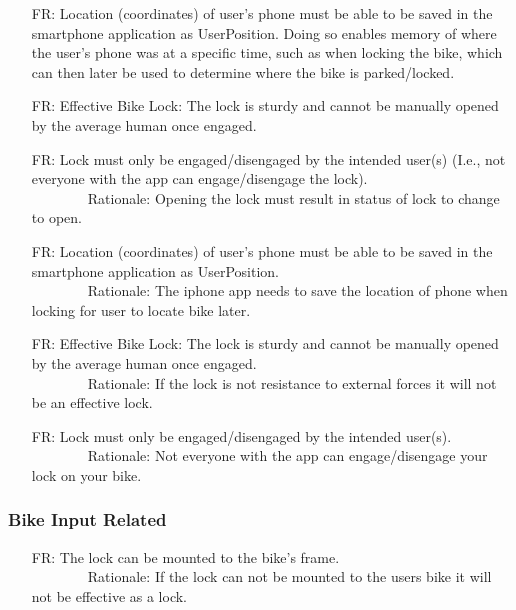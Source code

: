 \documentclass[12pt]{article}
\newcounter{reqnum} %
\newcounter{nfrnum} %
\begin{document}
\begin{itemize}
\item[FR\refstepcounter{reqnum}\thereqnum\label{FR7}:] Location (coordinates) of user’s phone must be able to be saved in the smartphone application as UserPosition. Doing so enables memory of where the user's phone was at a specific time, such as when locking the bike, which can then later be used to determine where the bike is parked/locked. 
\item[FR\refstepcounter{reqnum}\thereqnum\label{FR8}:] Effective Bike Lock: The lock is sturdy and cannot be manually  opened by the average human once engaged.
\item[FR\refstepcounter{reqnum}\thereqnum\label{FR9}:] Lock must only be engaged/disengaged by the intended user(s) (I.e., not everyone with the app can engage/disengage the lock).
\\ \-\ \-\ \-\ \-\ \-\ \-\ \-\ \-\ Rationale: Opening the lock must result in status of lock to change to open.
\item[FR\refstepcounter{reqnum}\thereqnum\label{FR7}:] Location (coordinates) of user’s phone must be able to be saved in the smartphone application as UserPosition.
\\ \-\ \-\ \-\ \-\ \-\ \-\ \-\ \-\ Rationale: The iphone app needs to save the location of phone when locking for user to locate bike later.
\item[FR\refstepcounter{reqnum}\thereqnum\label{FR8}:] Effective Bike Lock: The lock is sturdy and cannot be manually opened by the average human once engaged.
\\ \-\ \-\ \-\ \-\ \-\ \-\ \-\ \-\ Rationale: If the lock is not resistance to external forces it will not be an effective lock.
\item[FR\refstepcounter{reqnum}\thenfrnum\label{FR9}:] Lock must only be engaged/disengaged by the intended user(s).
\\ \-\ \-\ \-\ \-\ \-\ \-\ \-\ \-\ Rationale: Not everyone with the app can engage/disengage your lock on your bike.
\end{itemize}

\subsubsection{Bike Input Related}
\begin{itemize}
\setlength{\itemindent}{.5in}
\item[FR\refstepcounter{reqnum}\thereqnum\label{FR10}:] The lock can be mounted to the bike's frame.
\\ \-\ \-\ \-\ \-\ \-\ \-\ \-\ \-\ Rationale: If the lock can not be mounted to the users bike it will not be effective as a lock.
\end{itemize}
\end{document}
